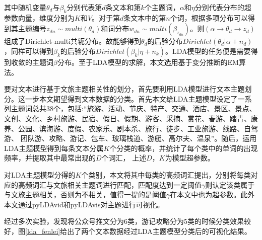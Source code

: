 \documentclass[bwprint]{gmcmthesis}
\begin{document}
其中随机变量$\theta_d$与$\beta_k$分别代表第$d$条文本和第$k$个主题词，$\alpha$和$\eta$分别代表分布的超参数向量，维度分别为$K$和$V$。对于第$d$条文本中的第$n$个词，根据多项分布可以得到其主题编号$z_{dn} \sim multi(\theta_d)$和词分布$w_{dn} \sim multi(\beta_{z_{dn}})$。则$(\alpha \rightarrow \theta_d \rightarrow z_d)$组成了Dirichlet-multi共轭分布。故能够得到$\theta_d$的后验分布$Dirichlet(\theta_d|\alpha + n_d)$，同样可以得到$\beta_k$的后验分布$Dirichlet(\beta_k|\eta + n_k)$。LDA模型的任务便是需要得到收敛的主题词$\beta$分布。至于LDA模型的求解，本文选用基于变分推断的EM算法。

要对文本进行基于文旅主题相关性的划分，首先要利用LDA模型进行文本主题划分。这一步本文期望得到文本数据的分类。首先本文给LDA主题模型设定了一系列主题词总共38个，包括:“旅游、活动、节庆、特产、交通、酒店、景区、景点、文创、文化、乡村旅游、民宿、假日、假期、游客、采摘、赏花、春游、踏青、康养、公园、滨海游、度假、农家乐、剧本杀、旅行、徒步、工业旅游、线路、自驾游、 团队游、攻略、游记、包车、玻璃栈道、游艇、高尔夫、温泉”。随后，运用LDA主题模型得到每条文本分属$K$个分类的概率，并统计了每个类中的单词的出现频率，并提取其中最常出现的$D$个词汇， 上述$D$，$K$为模型超参数。

对LDA主题模型分得的$K$个类别，本文将其中每类的高频词汇提出，分别将每类对应的高频词汇与文旅相关主题词进行匹配，匹配度达到一定阈值$\gamma$则认定该类属于与文旅主题相关，否则为不相关，值得一提的是阈值$\gamma$在本文中也为超参数。此外本文通过pyLDAvid和pyLDAvis对主题进行可视化。

经过多次实验，发现将公众号推文分为6类，游记攻略分为5类的时候分类效果较好，图\ref{lda_fenlei}给出了两个文本数据经过LDA主题模型分类后的可视化结果。
\end{document}
